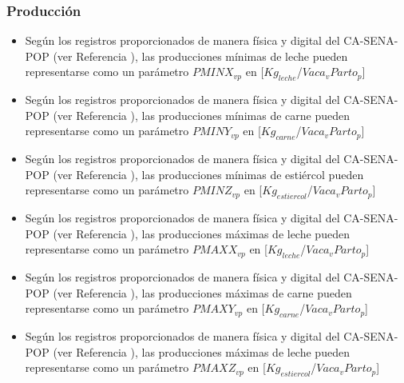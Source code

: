 \subsubsection{Producción}

\begin{itemize}
    \item Según los registros proporcionados de manera física y digital del CA-SENA-POP (ver Referencia \cite{casena}), las producciones mínimas de leche pueden representarse como un parámetro $PMINX_{vp}$ en [$Kg_{leche}$/$Vaca_{v}Parto_{p}$]
    \item Según los registros proporcionados de manera física y digital del CA-SENA-POP (ver Referencia \cite{casena}), las producciones mínimas de carne pueden representarse como un parámetro $PMINY_{vp}$ en [$Kg_{carne}$/$Vaca_{v}Parto_{p}$]
    \item Según los registros proporcionados de manera física y digital del CA-SENA-POP (ver Referencia \cite{casena}), las producciones mínimas de estiércol pueden representarse como un parámetro $PMINZ_{vp}$ en [$Kg_{estiercol}$/$Vaca_{v}Parto_{p}$]
    \item Según los registros proporcionados de manera física y digital del CA-SENA-POP (ver Referencia \cite{casena}), las producciones máximas de leche pueden representarse como un parámetro $PMAXX_{vp}$ en [$Kg_{leche}$/$Vaca_{v}Parto_{p}$]
    \item Según los registros proporcionados de manera física y digital del CA-SENA-POP (ver Referencia \cite{casena}), las producciones máximas de carne pueden representarse como un parámetro $PMAXY_{vp}$ en [$Kg_{carne}$/$Vaca_{v}Parto_{p}$]
    \item Según los registros proporcionados de manera física y digital del CA-SENA-POP (ver Referencia \cite{casena}), las producciones máximas de leche pueden representarse como un parámetro $PMAXZ_{vp}$ en [$Kg_{estiercol}$/$Vaca_{v}Parto_{p}$]
\end{itemize}

